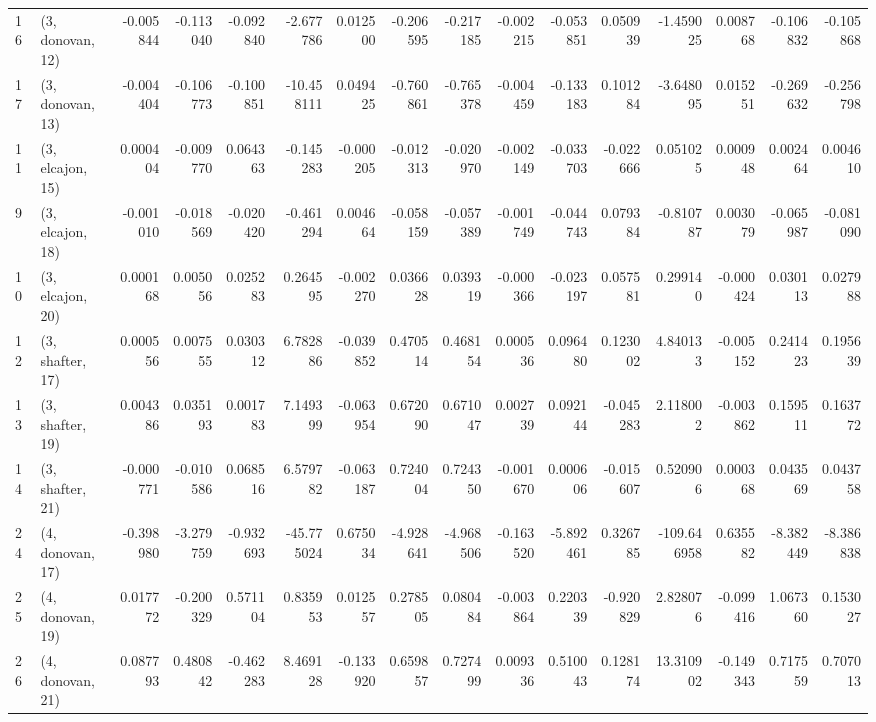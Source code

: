 \begin{tabular}{llrrrrrrrrrrrrrr}
16 &  (3, donovan, 12) &  -0.005844 & -0.113040 & -0.092840 &  -2.677786 &  0.012500 &  -0.206595 & -0.217185 & -0.002215 & -0.053851 &  0.050939 &   -1.459025 &  0.008768 & -0.106832 & -0.105868 \\
17 &  (3, donovan, 13) &  -0.004404 & -0.106773 & -0.100851 & -10.458111 &  0.049425 &  -0.760861 & -0.765378 & -0.004459 & -0.133183 &  0.101284 &   -3.648095 &  0.015251 & -0.269632 & -0.256798 \\
11 &  (3, elcajon, 15) &   0.000404 & -0.009770 &  0.064363 &  -0.145283 & -0.000205 &  -0.012313 & -0.020970 & -0.002149 & -0.033703 & -0.022666 &    0.051025 &  0.000948 &  0.002464 &  0.004610 \\
9  &  (3, elcajon, 18) &  -0.001010 & -0.018569 & -0.020420 &  -0.461294 &  0.004664 &  -0.058159 & -0.057389 & -0.001749 & -0.044743 &  0.079384 &   -0.810787 &  0.003079 & -0.065987 & -0.081090 \\
10 &  (3, elcajon, 20) &   0.000168 &  0.005056 &  0.025283 &   0.264595 & -0.002270 &   0.036628 &  0.039319 & -0.000366 & -0.023197 &  0.057581 &    0.299140 & -0.000424 &  0.030113 &  0.027988 \\
12 &  (3, shafter, 17) &   0.000556 &  0.007555 &  0.030312 &   6.782886 & -0.039852 &   0.470514 &  0.468154 &  0.000536 &  0.096480 &  0.123002 &    4.840133 & -0.005152 &  0.241423 &  0.195639 \\
13 &  (3, shafter, 19) &   0.004386 &  0.035193 &  0.001783 &   7.149399 & -0.063954 &   0.672090 &  0.671047 &  0.002739 &  0.092144 & -0.045283 &    2.118002 & -0.003862 &  0.159511 &  0.163772 \\
14 &  (3, shafter, 21) &  -0.000771 & -0.010586 &  0.068516 &   6.579782 & -0.063187 &   0.724004 &  0.724350 & -0.001670 &  0.000606 & -0.015607 &    0.520906 &  0.000368 &  0.043569 &  0.043758 \\
24 &  (4, donovan, 17) &  -0.398980 & -3.279759 & -0.932693 & -45.775024 &  0.675034 &  -4.928641 & -4.968506 & -0.163520 & -5.892461 &  0.326785 & -109.646958 &  0.635582 & -8.382449 & -8.386838 \\
25 &  (4, donovan, 19) &   0.017772 & -0.200329 &  0.571104 &   0.835953 &  0.012557 &   0.278505 &  0.080484 & -0.003864 &  0.220339 & -0.920829 &    2.828076 & -0.099416 &  1.067360 &  0.153027 \\
26 &  (4, donovan, 21) &   0.087793 &  0.480842 & -0.462283 &   8.469128 & -0.133920 &   0.659857 &  0.727499 &  0.009336 &  0.510043 &  0.128174 &   13.310902 & -0.149343 &  0.717559 &  0.707013 \\

\end{tabular}
